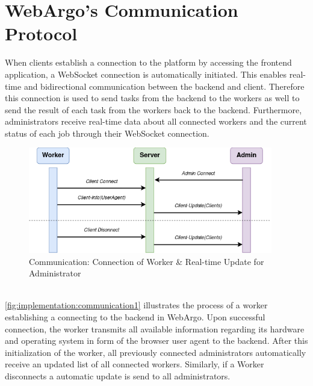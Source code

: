 \section{WebArgo's Communication Protocol}
\label{sec:implementation:communication}
When clients establish a connection to the platform by accessing the frontend application, a WebSocket connection is automatically initiated. This enables real-time and bidirectional communication between the backend and client. Therefore this connection is used to send tasks from the backend to the workers as well to send the result of each task from the workers back to the backend. Furthermore, administrators receive real-time data about all connected workers and the current status of each job through their WebSocket connection.
\begin{figure}[htbp]
    \centering
    \includegraphics[width=0.95\textwidth]{gfx/figures/communication-connection.png}
    \caption{Communication: Connection of Worker \& Real-time Update for Administrator}
    \label{fig:implementation:communication1}
\end{figure}
~\\
\autoref{fig:implementation:communication1} illustrates the process of a worker establishing a connecting to the backend in WebArgo. Upon successful connection, the worker transmits all available information regarding its hardware and operating system in form of the browser user agent to the backend. After this initialization of the worker, all previously connected administrators automatically receive an updated list of all connected workers. Similarly, if a Worker disconnects a automatic update is send to all administrators.
